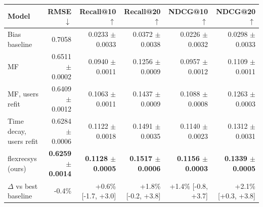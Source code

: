 \begin{tabular}{lrrrrr}
\toprule
Model & RMSE $\downarrow$ & Recall@10 $\uparrow$ & Recall@20 $\uparrow$ & NDCG@10 $\uparrow$ & NDCG@20 $\uparrow$ \\
\midrule
Bias baseline & 0.7058 & 0.0233 $\pm$ 0.0033 & 0.0372 $\pm$ 0.0038 & 0.0226 $\pm$ 0.0032 & 0.0298 $\pm$ 0.0033 \\
MF & 0.6511 $\pm$ 0.0002 & 0.0940 $\pm$ 0.0011 & 0.1256 $\pm$ 0.0009 & 0.0957 $\pm$ 0.0012 & 0.1109 $\pm$ 0.0011 \\
MF, users refit & 0.6409 $\pm$ 0.0012 & 0.1063 $\pm$ 0.0011 & 0.1437 $\pm$ 0.0009 & 0.1088 $\pm$ 0.0008 & 0.1263 $\pm$ 0.0003 \\
Time decay, users refit & 0.6284 $\pm$ 0.0006 & 0.1122 $\pm$ 0.0018 & 0.1491 $\pm$ 0.0035 & 0.1140 $\pm$ 0.0023 & 0.1312 $\pm$ 0.0031 \\
flexrecsys (ours) & \textbf{0.6259 $\pm$ 0.0014} & \textbf{0.1128 $\pm$ 0.0005} & \textbf{0.1517 $\pm$ 0.0006} & \textbf{0.1156 $\pm$ 0.0003} & \textbf{0.1339 $\pm$ 0.0005} \\
\midrule
$\Delta$ vs best baseline & -0.4\% & +0.6\% [-1.7, +3.0] & +1.8\% [-0.2, +3.8] & +1.4\% [-0.8, +3.7] & +2.1\% [+0.3, +3.8] \\
\bottomrule
\end{tabular}
